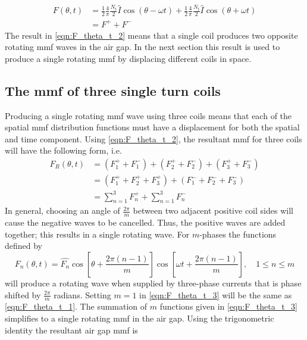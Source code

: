 \begin{equation}
  \label{eqn:F_theta_t_2}
  \begin{aligned}
  F(\theta,t) &= \frac{1}{2}\frac{4}{\pi}\frac{N_t }{2}\hat{I}\cos(\theta - \omega t)
  +\frac{1}{2}\frac{4}{\pi}\frac{N_t }{2}\hat{I}\cos(\theta + \omega t) \\
  &= F^+ + F^-
  \end{aligned}
\end{equation}
The result in \eqref{eqn:F_theta_t_2} means that a single coil produces two opposite rotating mmf waves in the air gap. In the next section this result is used to produce a single rotating mmf by displacing different coils in space. 

\subsection{The mmf of three single turn coils}
Producing a single rotating mmf wave using three coils means that each of the spatial mmf distribution functions must have a displacement for both the spatial and time component. Using \eqref{eqn:F_theta_t_2}, the resultant mmf for three coils will have the following form, i.e.
\begin{equation}
  \begin{aligned}
  F_R(\theta,t) &= (F_{1}^{+}+F_{1}^{-})+(F_{2}^{+}+F_{2}^{-})+(F_{3}^{+}+F_{3}^{-})\\
  &=(F_{1}^{+}+F_{2}^{+}+F_{3}^{+})+(F_{1}^{-}+F_{2}^{-}+F_{3}^{-})\\
  &=\sum_{n=1}^{3}F_{n}^{+}+\sum_{n=1}^{3}F_{n}^{-}
  \end{aligned}
\end{equation}
In general, choosing an angle of $\frac{2\pi}{m}$ between two adjacent positive coil sides will cause the negative waves to be cancelled. Thus, the positive waves are added together; this results in a single rotating wave. For $m$-phases the functions defined by
\begin{equation}
  \label{eqn:F_theta_t_3}
  F_n(\theta,t)=\hat{F_n}\cos\left[\theta+\frac{2\pi(n-1)}{m}\right]
  \cos\left[\omega t +\frac{2\pi(n-1)}{m}\right], \quad 1 \leq n \leq m
\end{equation}  
will produce a rotating wave when supplied by three-phase currents that is phase shifted by $\frac{2\pi}{m}$ radians. Setting $m=1$ in \eqref{eqn:F_theta_t_3} will be the same as \eqref{eqn:F_theta_t_1}. The summation of $m$ functions given in \eqref{eqn:F_theta_t_3} simplifies to a single rotating mmf in the air gap. Using the trigonometric identity the resultant air gap mmf is
